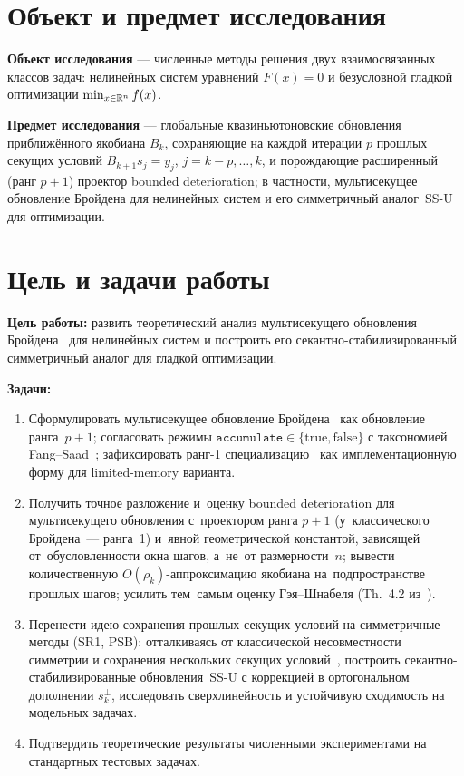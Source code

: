 \section*{Объект и предмет исследования}

\textbf{Объект исследования} --- численные методы решения двух
взаимосвязанных классов задач: нелинейных систем уравнений
$F(x) = 0$ и безусловной гладкой оптимизации $\min_{x\in\mathbb{R}^n} f(x)$.

\textbf{Предмет исследования} --- глобальные квазиньютоновские
обновления приближённого якобиана $B_k$, сохраняющие на каждой
итерации $p$ прошлых секущих условий $B_{k+1}s_j = y_j$,
$j=k{-}p,\ldots,k$, и порождающие расширенный (ранг $p{+}1$)
проектор bounded deterioration; в частности, мультисекущее обновление
Бройдена для нелинейных систем и его симметричный аналог~SS-U для
оптимизации.

\section*{Цель и задачи работы}

\textbf{Цель работы:} развить теоретический анализ мультисекущего
обновления Бройдена~\cite{schnabel1983} для нелинейных систем и
построить его секантно-стабилизированный симметричный аналог для
гладкой оптимизации.

\textbf{Задачи:}
\begin{enumerate}[leftmargin=*]
  \item Сформулировать мультисекущее обновление
        Бройдена~\cite{schnabel1983} как обновление ранга~$p+1$;
        согласовать режимы $\mathtt{accumulate}\in\{\text{true},\text{false}\}$
        с таксономией Fang--Saad~\cite{fang2009}; зафиксировать
        ранг-1 специализацию~\cite{gay_schnabel1978} как имплементационную
        форму для limited-memory варианта.
  \item Получить точное разложение и~оценку bounded deterioration для
        мультисекущего обновления с~проектором ранга $p{+}1$ (у~классического
        Бройдена~--- ранга~1) и~явной геометрической константой, зависящей
        от~обусловленности окна шагов, а~не~от размерности~$n$; вывести
        количественную $O(\rho_k)$-аппроксимацию якобиана на~подпространстве
        прошлых шагов; усилить тем~самым оценку Гэя--Шнабеля
        (Th.~4.2 из~\cite{gay_schnabel1978}).
  \item Перенести идею сохранения прошлых секущих условий
        на симметричные методы (SR1, PSB): отталкиваясь от
        классической несовместности симметрии и сохранения
        нескольких секущих условий~\cite{schnabel1983}, построить
        секантно-стабилизированные обновления~SS-U с коррекцией в
        ортогональном дополнении $s_k^{\perp}$, исследовать
        сверхлинейность и устойчивую сходимость на модельных задачах.
  \item Подтвердить теоретические результаты численными экспериментами
        на стандартных тестовых задачах.
\end{enumerate}

